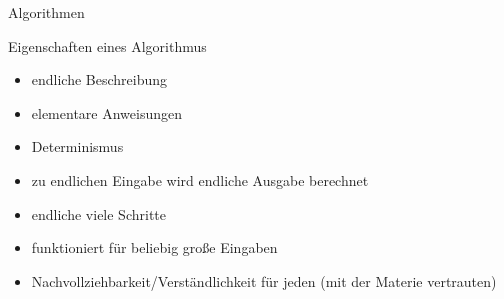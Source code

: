 \begin{frame}{Algorithmen}
\begin{block}{Eigenschaften eines Algorithmus}
\begin{itemize}
  \item endliche Beschreibung
  \item elementare Anweisungen
  \item Determinismus
  \item zu endlichen Eingabe wird endliche Ausgabe berechnet
  \item endliche viele Schritte
  \item funktioniert für beliebig große Eingaben
  \item Nachvollziehbarkeit/Verständlichkeit für jeden (mit der Materie vertrauten)
  \end{itemize}
\end{block}
    


\end{frame}


